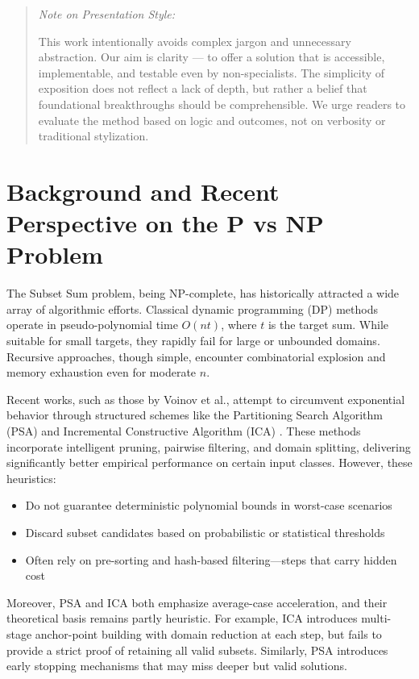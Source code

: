 \documentclass[11pt]{article}
\begin{document}
\begin{quote}

\textit{Note on Presentation Style:}

This work intentionally avoids complex jargon and unnecessary abstraction. Our aim is clarity — to offer a solution that is accessible, implementable, and testable even by non-specialists. The simplicity of exposition does not reflect a lack of depth, but rather a belief that foundational breakthroughs should be comprehensible. We urge readers to evaluate the method based on logic and outcomes, not on verbosity or traditional stylization.
\end{quote}

\section{Background and Recent Perspective on the P vs NP Problem} \label{sec:literature_review}

The Subset Sum problem, being NP-complete, has historically attracted a wide array of algorithmic efforts. Classical dynamic programming (DP) methods \cite{bellman1957dynamic} operate in pseudo-polynomial time $O(nt)$, where $t$ is the target sum. While suitable for small targets, they rapidly fail for large or unbounded domains. Recursive approaches, though simple, encounter combinatorial explosion and memory exhaustion even for moderate $n$.



Recent works, such as those by Voinov et al., attempt to circumvent exponential behavior through structured schemes like the Partitioning Search Algorithm (PSA) and Incremental Constructive Algorithm (ICA) \cite{voinov2023fast}. These methods incorporate intelligent pruning, pairwise filtering, and domain splitting, delivering significantly better empirical performance on certain input classes. However, these heuristics:
\begin{itemize}
  \item Do not guarantee deterministic polynomial bounds in worst-case scenarios
  \item Discard subset candidates based on probabilistic or statistical thresholds
  \item Often rely on pre-sorting and hash-based filtering—steps that carry hidden cost
\end{itemize}

Moreover, PSA and ICA both emphasize average-case acceleration, and their theoretical basis remains partly heuristic. For example, ICA introduces multi-stage anchor-point building with domain reduction at each step, but fails to provide a strict proof of retaining all valid subsets. Similarly, PSA introduces early stopping mechanisms that may miss deeper but valid solutions.
\end{document}
